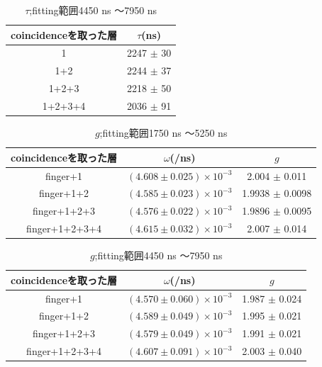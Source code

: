 \begin{table}[H]
\caption{$\tau$;fitting範囲4450 ns 〜7950 ns}
\label{fitrange2}
\begin{center}
\begin{tabular}{cc}\toprule
coincidenceを取った層 	& $\tau$(ns) \\ \midrule
1 			& 2247 $\pm$ 30 \\
1+2 			& 2244 $\pm$ 37 \\
1+2+3 			& 2218 $\pm$ 50 \\
1+2+3+4 		& 2036 $\pm$ 91 \\ \bottomrule
\end{tabular}
\end{center}
\end{table}%

\begin{table}[H]
\caption{$g$;fitting範囲1750 ns 〜5250 ns}
\label{fitrange3}
\begin{center}
\begin{tabular}{ccc}\toprule
coincidenceを取った層 	& $\omega$(/ns) 			& $g$ \\ \midrule
finger+1 		& $( 4.608 \pm 0.025 ) \times 10^{-3}$ 	& 2.004  $\pm$ 0.011 \\
finger+1+2 		& $( 4.585 \pm 0.023 ) \times 10^{-3}$ 	& 1.9938 $\pm$ 0.0098 \\
finger+1+2+3 		& $( 4.576 \pm 0.022 ) \times 10^{-3}$ 	& 1.9896 $\pm$ 0.0095 \\
finger+1+2+3+4 		& $( 4.615 \pm 0.032 ) \times 10^{-3}$ 	& 2.007  $\pm$ 0.014 \\ \bottomrule
\end{tabular}
\end{center}
\end{table}%

\begin{table}[H]
\caption{$g$;fitting範囲4450 ns 〜7950 ns}
\label{fitrange4}
\begin{center}
\begin{tabular}{ccc}\toprule
coincidenceを取った層 	& $\omega$(/ns) 			& $g$ \\ \midrule
finger+1 		& $( 4.570 \pm 0.060 ) \times 10^{-3}$ 	& 1.987 $\pm$ 0.024 \\
finger+1+2 		& $( 4.589 \pm 0.049 ) \times 10^{-3}$ 	& 1.995 $\pm$ 0.021 \\
finger+1+2+3 		& $( 4.579 \pm 0.049 ) \times 10^{-3}$ 	& 1.991 $\pm$ 0.021 \\
finger+1+2+3+4 		& $( 4.607 \pm 0.091 ) \times 10^{-3}$ 	& 2.003 $\pm$ 0.040 \\ \bottomrule
\end{tabular}
\end{center}
\end{table}%


